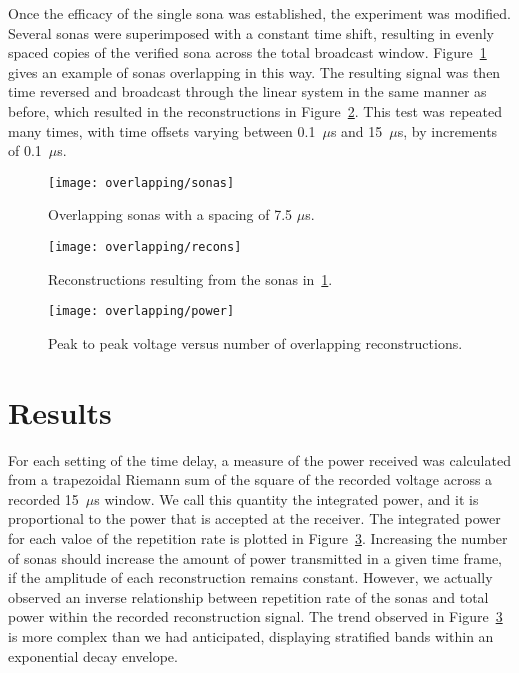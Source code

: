 Once the efficacy of the single sona was established, the experiment was modified. Several sonas were superimposed with a constant time shift, resulting in evenly spaced copies of the verified sona across the total broadcast window. Figure~\ref{fig:overlapping-sonas} gives an example of sonas overlapping in this way. The resulting signal was then time reversed and broadcast through the linear system in the same manner as before, which resulted in the reconstructions in Figure~\ref{fig:overlapping-recons}. This test was repeated many times, with time offsets varying between 0.1~$\mu$s and 15~$\mu$s, by increments of 0.1~$\mu$s.

\begin{figure}[t]
\centering
\texttt{[image: overlapping/sonas]}
\caption[Overlapping sonas]{Overlapping sonas with a spacing of 7.5 $\mu$s.}
\label{fig:overlapping-sonas}
\end{figure}

\begin{figure}[t]
\centering
\texttt{[image: overlapping/recons]}
\caption[Overlapping reconstructions]{Reconstructions resulting from the sonas in~\ref{fig:overlapping-sonas}.}
\label{fig:overlapping-recons}
\end{figure}

\begin{figure}[t]
\centering
\texttt{[image: overlapping/power]}
\caption[Max Vpp from overlapping reconstructions]{Peak to peak voltage versus number of overlapping reconstructions.}
\label{fig:overlapping-power}
\end{figure}

\section{Results}
\label{sec:overlapping-results}

For each setting of the time delay, a measure of the power received was calculated from a trapezoidal Riemann sum of the square of the recorded voltage across a recorded 15~$\mu$s window. We call this quantity the integrated power, and it is proportional to the power that is accepted at the receiver. The integrated power for each valoe of the repetition rate is plotted in Figure~\ref{fig:overlapping-power}. Increasing the number of sonas should increase the amount of power transmitted in a given time frame, if the amplitude of each reconstruction remains constant. However, we actually observed an inverse relationship between repetition rate of the sonas and total power within the recorded reconstruction signal. The trend observed in Figure~\ref{fig:overlapping-power} is more complex than we had anticipated, displaying stratified bands within an exponential decay envelope. 


